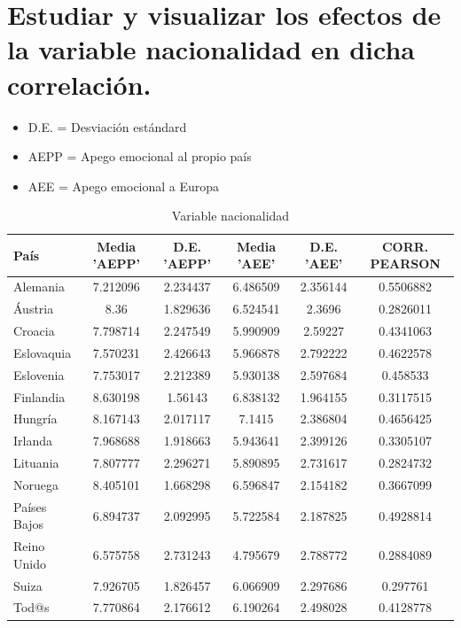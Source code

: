 \documentclass{article}
\begin{document}
\section{Estudiar y visualizar los efectos de la variable nacionalidad en dicha correlación.}
 \begin{itemize}
 \item D.E. = Desviación estándard
 \item AEPP = Apego emocional al propio país
 \item AEE = Apego emocional a Europa
 \end{itemize}
 \begin{table}[h!]
 \caption{Variable nacionalidad}
 \begin{tabular}{l | c c c c c}
 \hline
 \bf{País} & \bf{Media 'AEPP'} & \bf{D.E. 'AEPP'} & \bf{Media 'AEE'} & \bf{D.E. 'AEE'} & \bf{CORR. PEARSON} \\
 \hline
 Alemania & 7.212096 & 2.234437 & 6.486509 & 2.356144 & 0.5506882 \\
 Áustria & 8.36 & 1.829636 & 6.524541 & 2.3696 & 0.2826011 \\
 Croacia & 7.798714 & 2.247549 & 5.990909 & 2.59227 & 0.4341063 \\
 Eslovaquia & 7.570231 & 2.426643 & 5.966878 & 2.792222 & 0.4622578 \\
 Eslovenia & 7.753017 & 2.212389 & 5.930138 & 2.597684 & 0.458533 \\
 Finlandia & 8.630198 & 1.56143 & 6.838132 & 1.964155 & 0.3117515 \\
 Hungría & 8.167143 & 2.017117 & 7.1415 & 2.386804 & 0.4656425 \\
 Irlanda & 7.968688 & 1.918663 & 5.943641 & 2.399126 & 0.3305107 \\
 Lituania & 7.807777 & 2.296271 & 5.890895 & 2.731617 & 0.2824732 \\
 Noruega & 8.405101 & 1.668298 & 6.596847 & 2.154182 & 0.3667099 \\
 Países Bajos & 6.894737 & 2.092995 & 5.722584 & 2.187825 & 0.4928814 \\
 Reino Unido & 6.575758 & 2.731243 & 4.795679 & 2.788772 & 0.2884089 \\
 Suiza & 7.926705 & 1.826457 & 6.066909 & 2.297686 & 0.297761 \\
 Tod@s & 7.770864 & 2.176612 & 6.190264 & 2.498028 & 0.4128778 \\
 \hline
 \end{tabular}
 \end{table}
\end{document}
